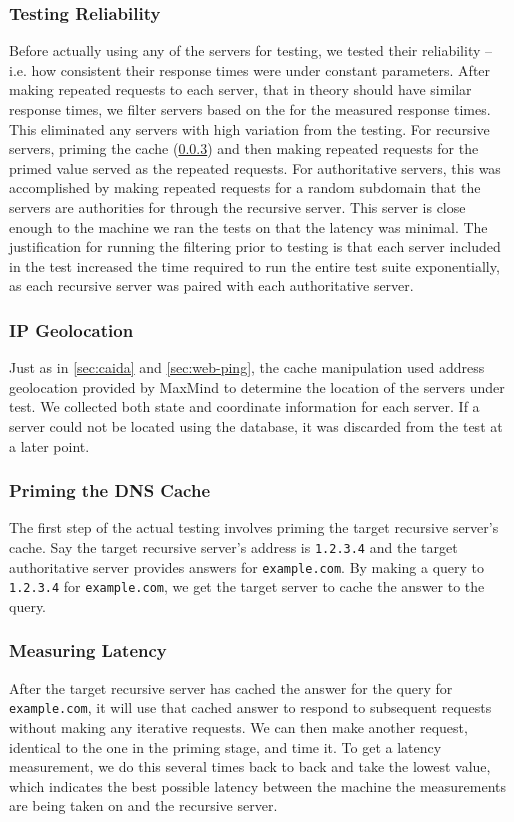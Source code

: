 \subsubsection{Testing Reliability}

Before actually using any of the servers for testing, we tested their reliability -- i.e. how consistent their response times were under constant parameters. After making repeated requests to each server, that in theory should have similar response times, we filter servers based on the \cv for the measured response times. This eliminated any servers with high variation from the testing. For recursive servers, priming the cache (\cref{sec:dns_cache_priming}) and then making repeated requests for the primed value served as the repeated requests. For authoritative servers, this was accomplished by making repeated requests for a random subdomain that the servers are authorities for through the \wpi recursive \dns server. This server is close enough to the machine we ran the tests on that the latency was minimal. The justification for running the filtering prior to testing is that each server included in the test increased the time required to run the entire test suite exponentially, as each recursive server was paired with each authoritative server.

\subsubsection{IP Geolocation}
Just as in \cref{sec:caida} and \cref{sec:web-ping}, the \dns cache manipulation used \ip address geolocation provided by MaxMind to determine the location of the servers under test. We collected both state and coordinate information for each server. If a server could not be located using the database, it was discarded from the test at a later point.

\subsubsection{Priming the DNS Cache}\label{sec:dns_cache_priming}
The first step of the actual testing involves priming the target recursive server's cache. Say the target recursive server's \ip address is \texttt{1.2.3.4} and the target authoritative server provides answers for \texttt{example.com}. By making a \dns query to \texttt{1.2.3.4} for \texttt{example.com}, we get the target \dns server to cache the answer to the query.

\subsubsection{Measuring Latency} 
After the target recursive server has cached the answer for the query for \texttt{example.com}, it will use that cached answer to respond to subsequent requests without making any iterative requests. We can then make another request, identical to the one in the priming stage, and time it. To get a latency measurement, we do this several times back to back and take the lowest value, which indicates the best possible latency between the machine the measurements are being taken on and the recursive server.

